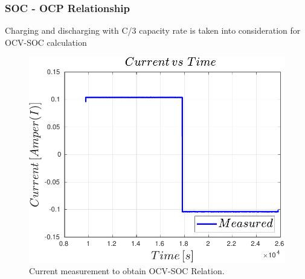 \documentclass{beamer}
\begin{document}
\begin{frame}
	
	\frametitle{SOC - OCP Relationship}
	
	Charging and discharging with C/3 capacity rate is taken
	into consideration for OCV-SOC calculation
	
	\begin{figure}
		\includegraphics[scale=0.65]{images/OCV_vs_SOC_Current.pdf}
		\vspace{-2mm}
		\caption{Current measurement to obtain OCV-SOC Relation.}
	\end{figure}
	
\end{frame}
\end{document}
